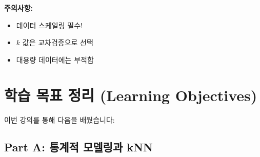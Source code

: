 \documentclass[12pt,a4paper]{article}
\begin{document}
\textbf{주의사항:}
\begin{itemize}
    \item 데이터 스케일링 필수!
    \item $k$ 값은 교차검증으로 선택
    \item 대용량 데이터에는 부적합
\end{itemize}

\section{학습 목표 정리 (Learning Objectives)}

이번 강의를 통해 다음을 배웠습니다:

\subsection{Part A: 통계적 모델링과 kNN}
\end{document}
